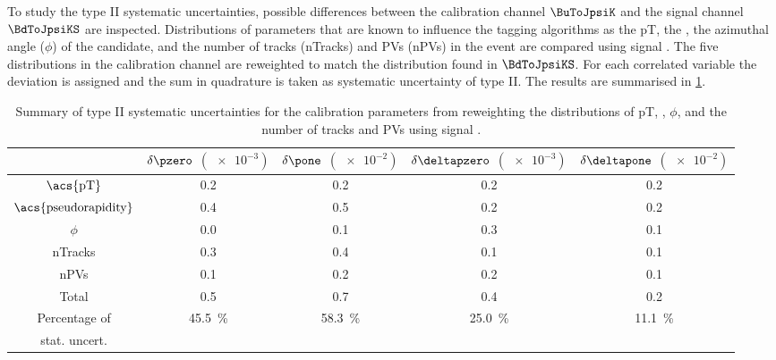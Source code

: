 To study the type II systematic uncertainties, possible differences between the
calibration channel $\BuToJpsiK$ and the signal channel $\BdToJpsiKS$ are
inspected. Distributions of parameters that are known to influence the tagging
algorithms as the \acf{pT}, the \pseudorapidity, the azimuthal angle ($\phi$) of
the \Bmeson candidate, and the number of tracks (nTracks) and \aclp{PV}
(n\acsp{PV}) in the event are compared using signal \sweights. The five
distributions in the calibration channel are reweighted to match the
distribution found in $\BdToJpsiKS$. For each correlated variable the deviation
is assigned and the sum in quadrature is taken as systematic uncertainty of type
II. The results are summarised in
\cref{tab:flavour_tagging:calibration:os:systematics}.
%
\begin{table}
  \centering
  \caption{Summary of type II systematic uncertainties for the \OS calibration
  parameters from reweighting the distributions of \ac{pT}, \pseudorapidity,
  $\phi$, and the number of tracks and \acp{PV} using signal \sweights.
  \cite{Aaij:2015vza}}
  \label{tab:flavour_tagging:calibration:os:systematics}
  \begin{tabular}{ccccc}
    \toprule
      & $\delta\pzero$ $(\num{e-3})$ & $\delta\pone$ $(\num{e-2})$ & $\delta\deltapzero$ $(\num{e-3})$ & $\delta\deltapone$ $(\num{e-2})$ \\
    \midrule
    $\text{\acs{pT}}$             & 0.2 & 0.2 & 0.2 & 0.2 \\
    $\text{\acs{pseudorapidity}}$ & 0.4 & 0.5 & 0.2 & 0.2 \\
    $\phi$                        & 0.0 & 0.1 & 0.3 & 0.1 \\
    nTracks                       & 0.3 & 0.4 & 0.1 & 0.1 \\
    nPVs                          & 0.1 & 0.2 & 0.2 & 0.1 \\
    \midrule
      Total                       & 0.5 & 0.7 & 0.4 & 0.2 \\
    \midrule
    Percentage of & 
    \multirow{2}[2]{*}{\SI{45.5}{\percent}} & 
    \multirow{2}[2]{*}{\SI{58.3}{\percent}} & 
    \multirow{2}[2]{*}{\SI{25.0}{\percent}} & 
    \multirow{2}[2]{*}{\SI{11.1}{\percent}} \\
    stat. uncert. \\
    \bottomrule
  \end{tabular}
\end{table}
%

